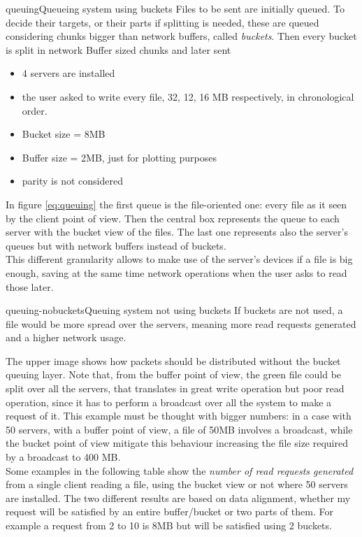 \begin{myimage}{queuing}{Queueing system using buckets}
    Files to be sent are initially queued. To decide their targets, or
    their parts if splitting is needed, these are queued considering
    chunks bigger than network buffers, called \textit{buckets}. Then every
    bucket is split in network Buffer sized chunks and later sent
\end{myimage}
\begin{itemize}
    \item 4 servers are installed
    \item the user asked to write every file, 32, 12, 16 MB respectively, in
        chronological order.
    \item Bucket size = 8MB
    \item Buffer size = 2MB, just for plotting purposes
    \item parity is not considered
\end{itemize}
In figure \ref{eq:queuing} the first queue is the file-oriented one: every file as it seen
by the client point of view.  Then the central box represents the queue to each
server with the bucket view of the files.  The last one represents also the
server's queues but with network buffers instead of buckets. \\ This different
granularity allows to make use of the server's devices if a file is big enough,
saving at the same time network operations when the user asks to read those
later.\\
\begin{myimage}{queuing-nobuckets}{Queuing system not using buckets}
    If buckets are not used, a file would be more spread over the servers,
    meaning more read requests generated and a higher network usage.
\end{myimage}
The upper image shows how packets should be distributed without the bucket queuing layer.
Note that, from the buffer point of view, the green file could be
split over all the servers, that translates in great write operation but poor
read operation, since it has to perform a broadcast over all the system to make
a request of it. This
example must be thought with bigger numbers: in a case with 50 servers, with a
buffer point of view, a file of 50MB involves a broadcast, while the bucket
point of view mitigate this behaviour increasing the file size required by a
broadcast to 400 MB. \\
Some examples in the following table show the \textit{number of read requests generated}
from a single client reading a file, using the bucket view or not where 50 servers are installed.
The two different results are based on data alignment, whether my request
will be satisfied by an entire buffer/bucket or two parts of them. For example a
request from 2 to 10 is 8MB but will be satisfied using 2 buckets.

